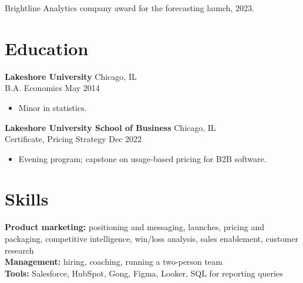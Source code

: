 \documentclass[11pt, letterpaper]{article}
\begin{document}
Brightline Analytics company award for the forecasting launch, 2023.

\section{Education}

\textbf{Lakeshore University} \hfill Chicago, IL \\
B.A. Economics \hfill May 2014
\begin{itemize}
  \item Minor in statistics.
\end{itemize}
\vspace{0pt}
\textbf{Lakeshore University School of Business} \hfill Chicago, IL \\
Certificate, Pricing Strategy \hfill Dec 2022
\begin{itemize}
  \item Evening program; capstone on usage-based pricing for B2B software.
\end{itemize}
\vspace{0pt}
\section{Skills}

\textbf{Product marketing:} positioning and messaging, launches, pricing and packaging, competitive intelligence, win/loss analysis, sales enablement, customer research \\
\textbf{Management:} hiring, coaching, running a two-person team \\
\textbf{Tools:} Salesforce, HubSpot, Gong, Figma, Looker, SQL for reporting queries


\par{}
\end{document}
